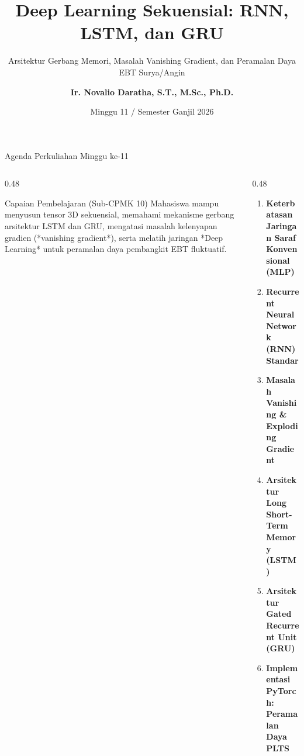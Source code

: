 \documentclass[aspectratio=169, 10pt]{beamer}
\title[\textbf{Deret Waktu (Minggu 11)}]{\textbf{Deep Learning Sekuensial: RNN, LSTM, dan GRU}}
\subtitle{Arsitektur Gerbang Memori, Masalah Vanishing Gradient, dan Peramalan Daya EBT Surya/Angin}
\author[\textbf{Ir. Novalio Daratha, Ph.D.}]{\textbf{Ir. Novalio Daratha, S.T., M.Sc., Ph.D.}}
\institute[FT UNIB]{Program Studi Teknik Elektro -- Fakultas Teknik\\Universitas Bengkulu}
\date{Minggu 11 / Semester Ganjil 2026}
\begin{document}
\begin{frame}[plain]
    \titlepage
\end{frame}

\begin{frame}{Agenda Perkuliahan Minggu ke-11}
    \begin{columns}[T]
        \begin{column}{0.48\textwidth}
            \begin{block}{Capaian Pembelajaran (Sub-CPMK 10)}
                Mahasiswa mampu menyusun tensor 3D sekuensial, memahami mekanisme gerbang arsitektur LSTM dan GRU, mengatasi masalah kelenyapan gradien (*vanishing gradient*), serta melatih jaringan *Deep Learning* untuk peramalan daya pembangkit EBT fluktuatif.
            \end{block}
        \end{column}
        \begin{column}{0.48\textwidth}
            \begin{enumerate}
                \item \textbf{Keterbatasan Jaringan Saraf Konvensional (MLP)}
                \item \textbf{Recurrent Neural Network (RNN) Standar}
                \item \textbf{Masalah Vanishing \& Exploding Gradient}
                \item \textbf{Arsitektur Long Short-Term Memory (LSTM)}
                \item \textbf{Arsitektur Gated Recurrent Unit (GRU)}
                \item \textbf{Implementasi PyTorch: Peramalan Daya PLTS}
            \end{enumerate}
        \end{column}
    \end{columns}
\end{frame}
\end{document}
